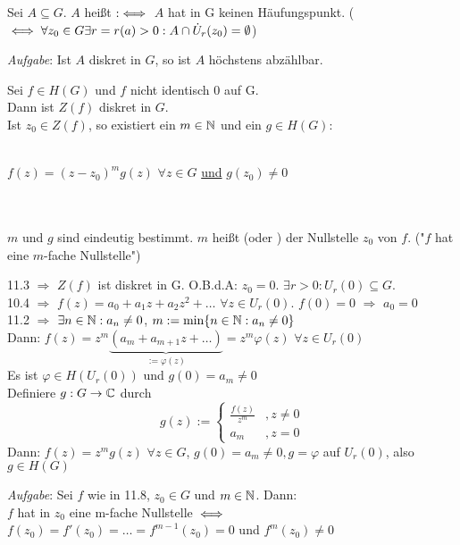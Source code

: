 \documentclass[a4paper,twoside,DIV15,BCOR12mm]{scrbook}
\begin{document}
\begin{definition}
Sei $A \subseteq G$. $A$ heißt  $:\iff$ $A$ hat in G
keinen Häufungspunkt. ($\iff \forall z_0 \in G \exists r = r(a) > 0 : A \cap
\dot{U}_r(z_0) = \emptyset$)
\end{definition}
\emph{Aufgabe}: Ist $A$ diskret in $G$, so ist $A$ höchstens abzählbar.
\begin{satz}
Sei $f \in H(G)$ und $f$ nicht identisch $0$ auf G. \\
Dann ist $Z(f)$ diskret in $G$. \\
Ist $z_0 \in Z(f)$, so existiert ein $m \in \mathbb{N}$ und ein $g \in H(G)$: \\ \\ 
\centerline{$f(z)
= (z-z_0)^m g(z)$ $\forall z \in G$ \underline{und} $g(z_0) \neq 0$} \\ \\$m$ und
$g$ sind eindeutig bestimmt. $m$ heißt  (oder
) der Nullstelle $z_0$ von $f$. ("$f$ hat eine $m$-fache Nullstelle")
\end{satz}
\begin{beweis}
11.3 $\Rightarrow $ $Z(f)$ ist diskret in G. O.B.d.A: $z_0 = 0$. $\exists r > 0:
U_r(0) \subseteq G.$ \\
10.4 $\Rightarrow$ $f(z) = a_0 + a_1z + a_2 z^2 + \dots$ $\forall z \in U_r(0)$.
 $f(0) = 0 $ $\Rightarrow$ $a_0 = 0$ \\
11.2 $\Rightarrow $ $\exists n \in \mathbb{N}: a_n \neq 0$, $m := \min \{n \in \mathbb{N}:
a_n \neq 0\}$ \\
Dann: $f(z) = z^m \underbrace{(a_m + a_{m+1}z + \dots)}_{:= \varphi(z)} = z^m 
\varphi(z)$ $\forall z \in U_r(0)$ \\
Es ist $\varphi \in H(U_r(0))$ und $g(0) = a_m \neq 0$ \\
Definiere $g: G \to \mathbb{C}$ durch 
\[g(z) := \begin{cases}
         	\frac{f(z)}{z^m} &, z \neq 0 \\
         	a_m              &, z = 0 
         \end{cases} \]
Dann: $f(z) = z^m g(z)$ $\forall z \in G$, $g(0) = a_m \neq 0, g = \varphi$ auf
$U_r(0)$, also $g \in H(G)$
\end{beweis}
\emph{Aufgabe}: Sei $f$ wie in 11.8, $z_0 \in G$ und $m \in \mathbb{N}$. Dann: \\ $f$
hat in $z_0$ eine m-fache Nullstelle $\iff$ $f(z_0) = f'(z_0) = \ldots =
f^{m-1}(z_0)=0$ und $f^m(z_0) \neq 0$
\end{document}
